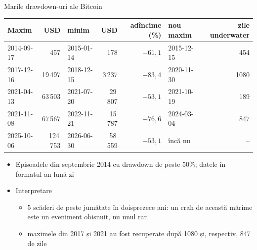 \begin{frame}{Marile drawdown-uri ale Bitcoin}
\itemsize{\footnotesize}
\begin{center}
\scriptsize
\begin{tabular}{lrlrrlr}
\toprule
Maxim & USD & minim & USD & adîncime (\%) & nou maxim & zile underwater \\
\midrule
2014-09-17 & 457 & 2015-01-14 & 178 & $-61{,}1$ & 2015-12-15 & 454 \\
2017-12-16 & 19\,497 & 2018-12-15 & 3\,237 & $-83{,}4$ & 2020-11-30 & 1080 \\
2021-04-13 & 63\,503 & 2021-07-20 & 29\,807 & $-53{,}1$ & 2021-10-19 & 189 \\
2021-11-08 & 67\,567 & 2022-11-21 & 15\,787 & $-76{,}6$ & 2024-03-04 & 847 \\
2025-10-06 & 124\,753 & 2026-06-30 & 58\,559 & $-53{,}1$ & încă nu & -- \\
\bottomrule
\end{tabular}
\end{center}
\begin{itemize}
    \item Episoadele din septembrie 2014 cu drawdown de peste 50\%; datele în formatul an-lună-zi
    \item Interpretare
    \begin{itemize}
        \item 5 scăderi de peste jumătate în doisprezece ani: un crah de această mărime este un eveniment obișnuit, nu unul rar
        \item maximele din 2017 și 2021 au fost recuperate după 1080 și, respectiv, 847 de zile
    \end{itemize}
\end{itemize}
\end{frame}


